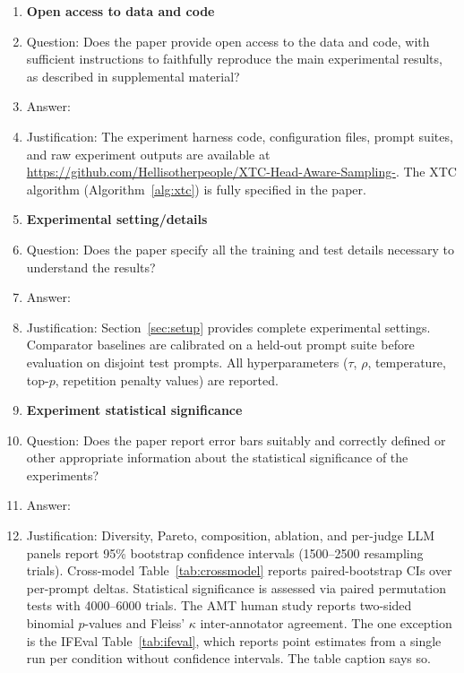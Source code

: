 \documentclass{article}
\newcommand{\xtc}{\textsc{XTC}}
\begin{document}
\begin{enumerate}
\item {\bf Open access to data and code}
    \item[] Question: Does the paper provide open access to the data and code, with sufficient instructions to faithfully reproduce the main experimental results, as described in supplemental material?
    \item[] Answer: \answerYes{}
    \item[] Justification: The experiment harness code, configuration files, prompt suites, and raw experiment outputs are available at \url{https://github.com/Hellisotherpeople/XTC-Head-Aware-Sampling-}. The \xtc{} algorithm (Algorithm~\ref{alg:xtc}) is fully specified in the paper.

\item {\bf Experimental setting/details}
    \item[] Question: Does the paper specify all the training and test details necessary to understand the results?
    \item[] Answer: \answerYes{}
    \item[] Justification: Section~\ref{sec:setup} provides complete experimental settings. Comparator baselines are calibrated on a held-out prompt suite before evaluation on disjoint test prompts. All hyperparameters ($\tau$, $\rho$, temperature, top-$p$, repetition penalty values) are reported.

\item {\bf Experiment statistical significance}
    \item[] Question: Does the paper report error bars suitably and correctly defined or other appropriate information about the statistical significance of the experiments?
    \item[] Answer: \answerYes{}
    \item[] Justification: Diversity, Pareto, composition, ablation, and per-judge LLM panels report 95\% bootstrap confidence intervals (1500--2500 resampling trials). Cross-model Table~\ref{tab:crossmodel} reports paired-bootstrap CIs over per-prompt deltas. Statistical significance is assessed via paired permutation tests with 4000--6000 trials. The AMT human study reports two-sided binomial $p$-values and Fleiss' $\kappa$ inter-annotator agreement. The one exception is the IFEval Table~\ref{tab:ifeval}, which reports point estimates from a single run per condition without confidence intervals. The table caption says so.


\end{enumerate}
\end{document}
